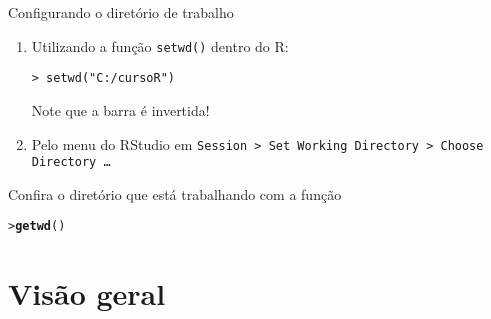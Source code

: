 \documentclass[10pt,handout]{beamer}\usepackage{graphicx, color}
\makeatletter
\newcommand{\hlfunctioncall}[1]{\textcolor[rgb]{0,0,0.545098039215686}{\textbf{#1}}}%
\newenvironment{kframe}{%
 \def\at@end@of@kframe{}%
 \ifinner\ifhmode%
  \def\at@end@of@kframe{\end{minipage}}%
  \begin{minipage}{\columnwidth}%
 \fi\fi%
 \def\FrameCommand##1{\hskip\@totalleftmargin \hskip-\fboxsep
 \colorbox{shadecolor}{##1}\hskip-\fboxsep
     \hskip-\linewidth \hskip-\@totalleftmargin \hskip\columnwidth}%
 \MakeFramed {\advance\hsize-\width
   \@totalleftmargin\z@ \linewidth\hsize
   \@setminipage}}%
 {\par\unskip\endMakeFramed%
 \at@end@of@kframe}
\newenvironment{knitrout}{}{} %
\makeatother
\begin{document}
\begin{frame}[fragile=singleslide]{Configurando o diretório de trabalho}
\begin{enumerate}
\item Utilizando a função \texttt{setwd()} dentro do R:
\begin{verbatim}
> setwd("C:/cursoR")
\end{verbatim}
Note que a barra é invertida!
\item Pelo menu do RStudio em \texttt{Session > Set Working Directory >
  Choose Directory \ldots}
\end{enumerate}
Confira o diretório que está trabalhando com a função
\begin{knitrout}\small
{}\color{fgcolor}\begin{kframe}
\begin{alltt}
> \hlfunctioncall{getwd}()
\end{alltt}
\end{kframe}
\end{knitrout}

\end{frame}

\section{Visão geral}

\end{document}
